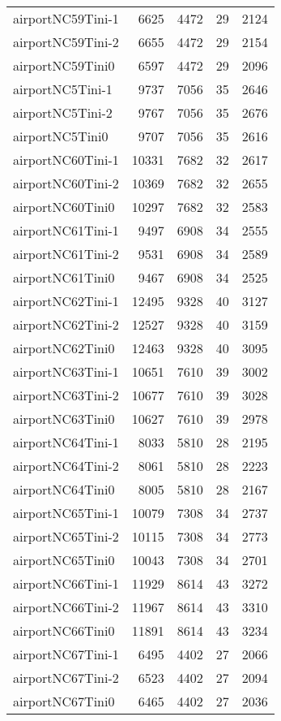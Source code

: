 \begin{tabular}{lrrrr}
airportNC59Tini-1 & 6625 & 4472 & 29 & 2124 \\
airportNC59Tini-2 & 6655 & 4472 & 29 & 2154 \\
airportNC59Tini0 & 6597 & 4472 & 29 & 2096 \\
airportNC5Tini-1 & 9737 & 7056 & 35 & 2646 \\
airportNC5Tini-2 & 9767 & 7056 & 35 & 2676 \\
airportNC5Tini0 & 9707 & 7056 & 35 & 2616 \\
airportNC60Tini-1 & 10331 & 7682 & 32 & 2617 \\
airportNC60Tini-2 & 10369 & 7682 & 32 & 2655 \\
airportNC60Tini0 & 10297 & 7682 & 32 & 2583 \\
airportNC61Tini-1 & 9497 & 6908 & 34 & 2555 \\
airportNC61Tini-2 & 9531 & 6908 & 34 & 2589 \\
airportNC61Tini0 & 9467 & 6908 & 34 & 2525 \\
airportNC62Tini-1 & 12495 & 9328 & 40 & 3127 \\
airportNC62Tini-2 & 12527 & 9328 & 40 & 3159 \\
airportNC62Tini0 & 12463 & 9328 & 40 & 3095 \\
airportNC63Tini-1 & 10651 & 7610 & 39 & 3002 \\
airportNC63Tini-2 & 10677 & 7610 & 39 & 3028 \\
airportNC63Tini0 & 10627 & 7610 & 39 & 2978 \\
airportNC64Tini-1 & 8033 & 5810 & 28 & 2195 \\
airportNC64Tini-2 & 8061 & 5810 & 28 & 2223 \\
airportNC64Tini0 & 8005 & 5810 & 28 & 2167 \\
airportNC65Tini-1 & 10079 & 7308 & 34 & 2737 \\
airportNC65Tini-2 & 10115 & 7308 & 34 & 2773 \\
airportNC65Tini0 & 10043 & 7308 & 34 & 2701 \\
airportNC66Tini-1 & 11929 & 8614 & 43 & 3272 \\
airportNC66Tini-2 & 11967 & 8614 & 43 & 3310 \\
airportNC66Tini0 & 11891 & 8614 & 43 & 3234 \\
airportNC67Tini-1 & 6495 & 4402 & 27 & 2066 \\
airportNC67Tini-2 & 6523 & 4402 & 27 & 2094 \\
airportNC67Tini0 & 6465 & 4402 & 27 & 2036 \\

\end{tabular}
